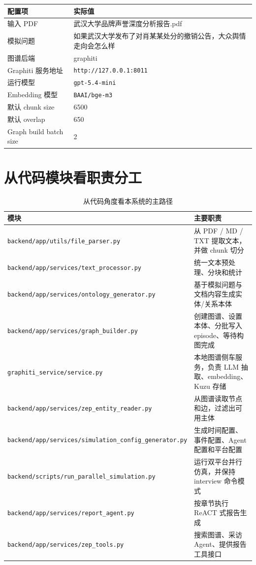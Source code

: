 \documentclass[UTF8,10pt,oneside]{ctexbook}
\newcommand{\code}[1]{\nolinkurl{#1}}
\begin{document}
\begin{casebox}[本次案例正式配置]
\begin{tabularx}{\textwidth}{p{4.2cm}X}
\toprule
配置项 & 实际值 \\
\midrule
输入 PDF & 武汉大学品牌声誉深度分析报告.pdf \\
模拟问题 & 如果武汉大学发布了对肖某某处分的撤销公告，大众舆情走向会怎么样 \\
图谱后端 & graphiti \\
Graphiti 服务地址 & \code{http://127.0.0.1:8011} \\
运行模型 & \code{gpt-5.4-mini} \\
Embedding 模型 & \code{BAAI/bge-m3} \\
默认 chunk size & 6500 \\
默认 overlap & 650 \\
Graph build batch size & 2 \\
\bottomrule
\end{tabularx}
\end{casebox}

\section{从代码模块看职责分工}

\begin{table}[H]
\centering
\small
\begin{tabularx}{\textwidth}{p{4.3cm}X}
\toprule
模块 & 主要职责 \\
\midrule
\code{backend/app/utils/file\_parser.py} & 从 PDF / MD / TXT 提取文本，并做 chunk 切分 \\
\code{backend/app/services/text\_processor.py} & 统一文本预处理、分块和统计 \\
\code{backend/app/services/ontology\_generator.py} & 基于模拟问题与文档内容生成实体/关系本体 \\
\code{backend/app/services/graph\_builder.py} & 创建图谱、设置本体、分批写入 episode、等待构图完成 \\
\code{graphiti\_service/service.py} & 本地图谱侧车服务，负责 LLM 抽取、embedding、Kuzu 存储 \\
\code{backend/app/services/zep\_entity\_reader.py} & 从图谱读取节点和边，过滤出可用主体 \\
\code{backend/app/services/simulation\_config\_generator.py} & 生成时间配置、事件配置、Agent 配置和平台配置 \\
\code{backend/scripts/run\_parallel\_simulation.py} & 运行双平台并行仿真，并保持 interview 命令模式 \\
\code{backend/app/services/report\_agent.py} & 按章节执行 ReACT 式报告生成 \\
\code{backend/app/services/zep\_tools.py} & 搜索图谱、采访 Agent、提供报告工具接口 \\
\bottomrule
\end{tabularx}
\caption{从代码角度看本系统的主路径}
\end{table}
\end{document}
